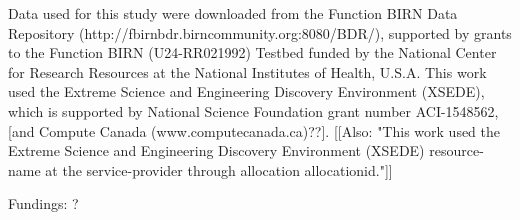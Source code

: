 \documentclass{article} %
\begin{document}
Data used for this study were downloaded from the Function BIRN Data Repository (http://fbirnbdr.birncommunity.org:8080/BDR/), supported by grants to the Function BIRN (U24-RR021992) Testbed funded by the National Center for Research Resources at the National Institutes of Health, U.S.A.	
This work used the Extreme Science and Engineering Discovery Environment (XSEDE), which is supported by National Science Foundation grant number ACI-1548562, [and Compute Canada (www.computecanada.ca)??]. 
[[Also: "This work used the Extreme Science and Engineering Discovery Environment (XSEDE) resource-name at the service-provider through allocation allocationid."]]

Fundings: ? 




\end{document}
